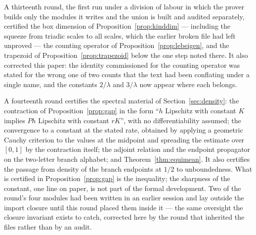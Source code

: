 \documentclass[11pt,reqno]{amsart}
\theoremstyle{plain}
\theoremstyle{definition}
\theoremstyle{remark}
\begin{document}
A thirteenth round, the first run under a division of labour in which the
prover builds only the modules it writes and the union is built and audited
separately, certified the box dimension of Proposition~\ref{prop:kinddim} ---
including the squeeze from triadic scales to all scales, which the earlier
broken file had left unproved --- the counting operator of
Proposition~\ref{prop:lebeigen}, and the trapezoid of
Proposition~\ref{prop:trapezoid} below the one step noted there. It also
corrected this paper: the identity commissioned for the counting operator was
stated for the wrong one of two counts that the text had been conflating under
a single name, and the constants $2/\lambda$ and $3/\lambda$ now appear where
each belongs.

A fourteenth round certifies the spectral material of
Section~\ref{sec:density}: the contraction of Proposition~\ref{prop:gap} in
the form ``$h$ Lipschitz with constant $K$ implies $Ph$ Lipschitz with
constant $rK$'', with no differentiability assumed; the convergence to a
constant at the stated rate, obtained by applying a geometric Cauchy
criterion to the values at the midpoint and spreading the estimate over
$[0,1]$ by the contraction itself; the adjoint
relation and the endpoint propagator on the two-letter branch alphabet; and
Theorem~\ref{thm:equimean}. It also certifies the passage from density of the
branch endpoints at $1/2$ to unboundedness. What is certified in Proposition~\ref{prop:gap} is
the inequality; the sharpness of the constant, one line on paper, is not part
of the formal development. Two of the round's four modules had been
written in an earlier session and lay outside the import closure until this
round placed them inside it --- the same oversight the closure invariant
exists to catch, corrected here by the round that inherited the files rather
than by an audit.
\end{document}
